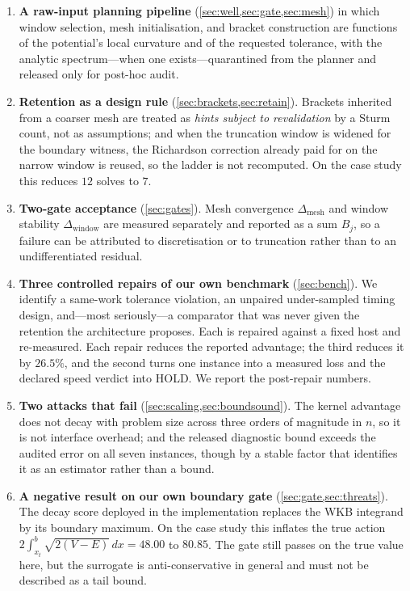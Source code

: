 \documentclass[twocolumn,10pt,a4paper]{article}
\theoremstyle{plain}
\theoremstyle{definition}
\newcommand{\HOLD}{\textsf{HOLD}}
\begin{document}
\begin{enumerate}
\item \textbf{A raw-input planning pipeline} (\cref{sec:well,sec:gate,sec:mesh})
in which window selection, mesh initialisation, and bracket construction are
functions of the potential's local curvature and of the requested tolerance,
with the analytic spectrum---when one exists---quarantined from the planner and
released only for post-hoc audit.

\item \textbf{Retention as a design rule} (\cref{sec:brackets,sec:retain}).
Brackets inherited from a coarser mesh are treated as \emph{hints subject to
revalidation} by a Sturm count, not as assumptions; and when the truncation
window is widened for the boundary witness, the Richardson correction already
paid for on the narrow window is reused, so the ladder is not recomputed. On
the case study this reduces $12$ solves to $7$.

\item \textbf{Two-gate acceptance} (\cref{sec:gates}). Mesh convergence
$\Delta_{\mathrm{mesh}}$ and window stability $\Delta_{\mathrm{window}}$ are
measured separately and reported as a sum $B_j$, so a failure can be attributed
to discretisation or to truncation rather than to an undifferentiated residual.

\item \textbf{Three controlled repairs of our own benchmark}
(\cref{sec:bench}). We identify a same-work tolerance violation, an unpaired
under-sampled timing design, and---most seriously---a comparator that was never
given the retention the architecture proposes. Each is repaired against a fixed
host and re-measured. Each repair reduces the reported advantage; the third
reduces it by $26.5\%$, and the second turns one instance into a measured loss
and the declared speed verdict into \HOLD{}. We report the post-repair numbers.

\item \textbf{Two attacks that fail} (\cref{sec:scaling,sec:boundsound}). The
kernel advantage does not decay with problem size across three orders of
magnitude in $n$, so it is not interface overhead; and the released diagnostic
bound exceeds the audited error on all seven instances, though by a stable
factor that identifies it as an estimator rather than a bound.

\item \textbf{A negative result on our own boundary gate}
(\cref{sec:gate,sec:threats}). The decay score deployed in the implementation
replaces the WKB integrand by its boundary maximum. On the case study this
inflates the true action $2\int_{x_t}^{b}\sqrt{2(V-E)}\,dx = 48.00$ to $80.85$.
The gate still passes on the true value here, but the surrogate is
anti-conservative in general and must not be described as a tail bound.
\end{enumerate}
\end{document}

